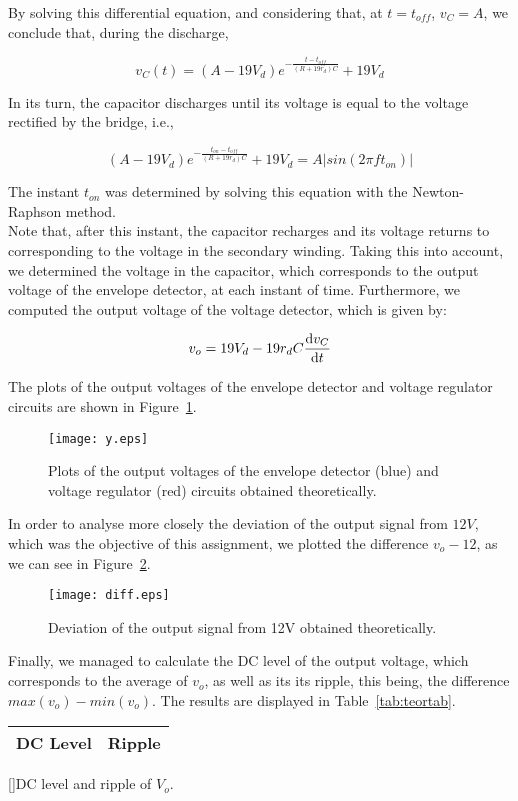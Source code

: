 By solving this differential equation, and considering that, at $t=t_{off}$, $v_C=A$, we conclude that, during the discharge,

\begin{equation}
v_C(t) = (A-19V_d)e^{-\frac{t-t_{off}}{(R+19r_d)C}}+19V_d
\end{equation}

In its turn, the capacitor discharges until its voltage is equal to the voltage rectified by the bridge, i.e.,

\begin{equation}
(A-19V_d)e^{-\frac{t_{on}-t_{off}}{(R+19r_d)C}}+19V_d = A\left|sin(2\pi ft_{on})\right|
\end{equation}

The instant $t_{on}$ was determined by solving this equation with the Newton-Raphson method. \\

Note that, after this instant, the capacitor recharges and its voltage returns to corresponding to the voltage in the secondary winding. Taking this into account, we determined the voltage in the capacitor, which corresponds to the output voltage of the envelope detector, at each instant of time. Furthermore, we computed the output voltage of the voltage detector, which is given by:

\begin{equation}
v_o = 19V_d-19 r_d C\odv{v_C}{t}
\end{equation}

The plots of the output voltages of the envelope detector and voltage regulator circuits are shown in Figure~\ref{fig:teorplots}.

\begin{figure}[H] \centering
\texttt{[image: y.eps]}
\caption{Plots of the output voltages of the envelope detector (blue) and voltage regulator (red) circuits obtained theoretically.}
\label{fig:teorplots}
\end{figure}

In order to analyse more closely the deviation of the output signal from $12V$, which was the objective of this assignment, we plotted the difference $v_o-12$, as we can see in Figure~\ref{fig:diff}.

\begin{figure}[H] \centering
\texttt{[image: diff.eps]}
\caption{Deviation of the output signal from 12V obtained theoretically.}
\label{fig:diff}
\end{figure}

Finally, we managed to calculate the DC level of the output voltage, which corresponds to the average of $v_o$, as well as its its ripple, this being, the difference $max(v_o)-min(v_o)$. The results are displayed in Table~\ref{tab:teortab}.

\begin{center}
\begin{tabular}{ | c | c | }\hline
DC Level & Ripple \\
\hline
 
\end{tabular}
[]{DC level and ripple of $V_o$.}
\label{tab:teortab}
\end{center}
